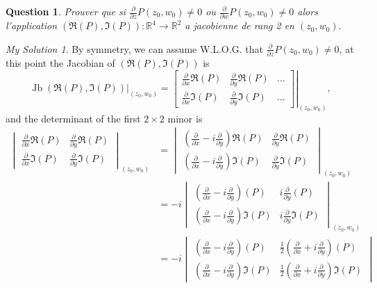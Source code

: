 \documentclass[]{article}
\newtheorem{prop}{Question}
\theoremstyle{remark}
\newtheorem*{sol}{My Solution}
\begin{document}
\begin{prop}
	Prouver que si $\frac{\partial}{\partial z} P\left(z_{0}, w_{0}\right) \neq 0$ ou $\frac{\partial}{\partial w} P\left(z_{0}, w_{0}\right) \neq 0$ alors l'application $(\Re(P), \Im(P)):\mathbb{R}^{4} \rightarrow \mathbb{R}^{2}$ a jacobienne de rang 2 en $\left(z_{0}, w_{0}\right).$
\end{prop}
\begin{sol}
	By symmetry, we can assume W.L.O.G. that $\frac{\partial}{\partial z} P\left(z_{0}, w_{0}\right) \neq 0$, at this point the Jacobian of $ (\Re(P), \Im(P)) $ is
	\[ \left. \operatorname{Jb}\left( \Re(P), \Im(P) \right)\right| _{(z_{0}, w_{0})} = \left. \begin{bmatrix}
	\frac{\partial}{\partial x}\Re(P)& \frac{\partial}{\partial y}\Re(P) &  \ldots\\ 
	\frac{\partial}{\partial x}\Im(P)& \frac{\partial}{\partial y}\Im(P) & \ldots
	\end{bmatrix}\right|_{(z_{0}, w_{0})},
	 \]
	and the determinant of the first $ 2\times 2 $ minor is
\[ \begin{aligned}
	\begin{vmatrix}
	\frac{\partial}{\partial x}\Re(P)& \frac{\partial}{\partial y}\Re(P) \\ 
	\frac{\partial}{\partial x}\Im(P)& \frac{\partial}{\partial y}\Im(P)
	\end{vmatrix}_{(z_{0}, w_{0})}
	&=\begin{vmatrix}
	(\frac{\partial}{\partial x}-i\frac{\partial}{\partial y})\Re(P) & \frac{\partial}{\partial y}\Re(P) \\ 
	(\frac{\partial}{\partial x}-i\frac{\partial}{\partial y}) \Im(P)& \frac{\partial}{\partial y}\Im(P)
	\end{vmatrix}_{(z_{0}, w_{0})} \\
	&=-i\begin{vmatrix}
	(\frac{\partial}{\partial x}-i\frac{\partial}{\partial y})(P) & i\frac{\partial}{\partial y}(P) \\ 
	(\frac{\partial}{\partial x}-i\frac{\partial}{\partial y}) \Im(P)& i\frac{\partial}{\partial y}\Im(P)
	\end{vmatrix}_{(z_{0}, w_{0})} \\
	&=-i\begin{vmatrix}
	(\frac{\partial}{\partial x}-i\frac{\partial}{\partial y})(P) & \frac{1}{2}(\frac{\partial}{\partial x}+i\frac{\partial}{\partial y})(P)\\ 
	(\frac{\partial}{\partial x}-i\frac{\partial}{\partial y}) \Im(P)& \frac{1}{2}(\frac{\partial}{\partial x}+i\frac{\partial}{\partial y}) \Im(P)

\end{vmatrix}
\end{aligned}\]
\end{sol}
\end{document}
